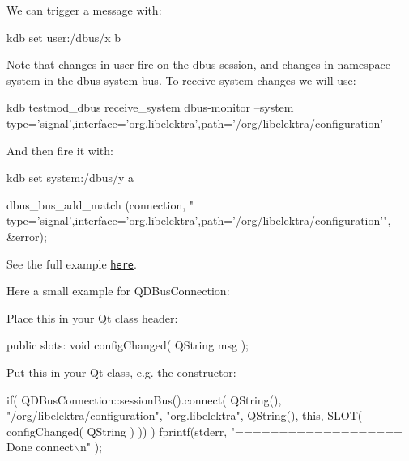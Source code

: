We can trigger a message with\+:


\begin{DoxyCode}
kdb set user:/dbus/x b
\end{DoxyCode}


Note that changes in {\ttfamily user} fire on the dbus {\ttfamily session}, and changes in namespace {\ttfamily system} in the dbus {\ttfamily system} bus. To receive {\ttfamily system} changes we will use\+:


\begin{DoxyCode}
kdb testmod\_dbus receive\_system
dbus-monitor --system type='signal',interface='org.libelektra',path='/org/libelektra/configuration'
\end{DoxyCode}


And then fire it with\+:


\begin{DoxyCode}
kdb set system:/dbus/y a
\end{DoxyCode}



\begin{DoxyCode}
dbus\_bus\_add\_match (connection, \textcolor{stringliteral}{"
      type='signal',interface='org.libelektra',path='/org/libelektra/configuration'"}, &error);
\end{DoxyCode}


See the full example \href{/home/jenkins/workspace/libelektra-release/src/plugins/dbus/receivemessage.c}{\tt here}.

Here a small example for Q\+D\+Bus\+Connection\+:

Place this in your Qt class header\+:


\begin{DoxyCode}
\textcolor{keyword}{public} slots:
  \textcolor{keywordtype}{void} configChanged( QString msg );
\end{DoxyCode}


Put this in your Qt class, e.\+g. the constructor\+:


\begin{DoxyCode}
\textcolor{keywordflow}{if}( QDBusConnection::sessionBus().connect( QString(), \textcolor{stringliteral}{"/org/libelektra/configuration"}, \textcolor{stringliteral}{"org.libelektra"}, 
      QString(),
                                       \textcolor{keyword}{this}, SLOT( configChanged( QString ) )) )
    fprintf(stderr, \textcolor{stringliteral}{"=================== Done connect\(\backslash\)n"} );
\end{DoxyCode}


